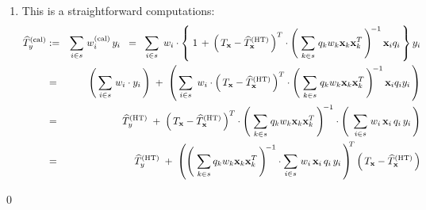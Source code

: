 \begin{enumerate}
\begin{eqnarray*}
                \;\right)^{\!\!-1}
    \end{eqnarray*}
    Hence,
    \begin{eqnarray*}
    w_{i}^{\textnormal{(cal)}}
    & = &
        w_{i}\cdot\left(\;
            1 + \lambda^{T} \cdot \mathbf{x}_{i}\,q_{i}
            \;\right)
    \;\; = \;\;
        w_{i}\cdot\left\{\;
            1
            \,+\,
            \left(\,T_{\mathbf{x}} - \widehat{T}_{\mathbf{x}}^{\textnormal{(HT)}}\,\right)^{T}
            \cdot
            \left(\;
                \underset{k \in s}{\sum}\;\,q_{k}\,w_{k}\cdot\mathbf{x}_{k}\cdot\mathbf{x}_{k}^{T}
                \,\right)^{\!-1}
            \mathbf{x}_{i}\,q_{i}
            \,\right\}
    \end{eqnarray*}
\item
    This is a straightforward computations:
    \begin{eqnarray*}
    \widehat{T}_{y}^{\textnormal{(cal)}}
    & := &
        \underset{i \in s}{\sum}\;
        w^{\textnormal{(cal)}}_{i}\,y_{i}
    \;\; = \;\;
        \underset{i \in s}{\sum}\;\,
        w_{i}\cdot\left\{\;
            1
            \,+\,
            \left(\,T_{\mathbf{x}} - \widehat{T}_{\mathbf{x}}^{\textnormal{(HT)}}\,\right)^{T}
            \cdot
            \left(\;
                \underset{k \in s}{\sum}\;q_{k}w_{k}\mathbf{x}_{k}\mathbf{x}_{k}^{T}
                \,\right)^{\!-1}
            \mathbf{x}_{i}q_{i}
            \,\right\}
        y_{i}
    \\
    & = &
        \left(\,\underset{i \in s}{\sum}\;w_{i} \cdot y_{i}\,\right)
        \; + \;
        \left(\,
            \underset{i \in s}{\sum}\;\,
            w_{i}\cdot
                \left(\,T_{\mathbf{x}} - \widehat{T}_{\mathbf{x}}^{\textnormal{(HT)}}\,\right)^{T}
                \cdot
                \left(\;
                    \underset{k \in s}{\sum}\;q_{k}w_{k}\mathbf{x}_{k}\mathbf{x}_{k}^{T}
                    \,\right)^{\!-1}
                \mathbf{x}_{i}q_{i}
            y_{i}
            \,\right)
    \\
    & = &
        \widehat{T}^{\textnormal{(HT)}}_{y}
        \; + \;
        \left(\,T_{\mathbf{x}} - \widehat{T}_{\mathbf{x}}^{\textnormal{(HT)}}\,\right)^{T}
        \cdot
        \left(\;
            \underset{k \in s}{\sum}\;q_{k}w_{k}\mathbf{x}_{k}\mathbf{x}_{k}^{T}
            \,\right)^{\!-1}
        \cdot
        \left(\;\,
            \underset{i \in s}{\sum}\;
            w_{i}\,\mathbf{x}_{i}\,q_{i}\,y_{i}
            \,\right)
    \\
    & = &
        \widehat{T}^{\textnormal{(HT)}}_{y}
        \; + \;
        \left(
            \left(\;
                \underset{k \in s}{\sum}\,q_{k}w_{k}\mathbf{x}_{k}\mathbf{x}_{k}^{T}
                \,\right)^{\!-1}
            \cdot
            \underset{i \in s}{\sum}\;
            w_{i}\,\mathbf{x}_{i}\,q_{i}\,y_{i}
            \,\right)^{\!\!T}
        \left(\,T_{\mathbf{x}} - \widehat{T}_{\mathbf{x}}^{\textnormal{(HT)}}\,\right)
    \end{eqnarray*}
\end{enumerate}
\qed

